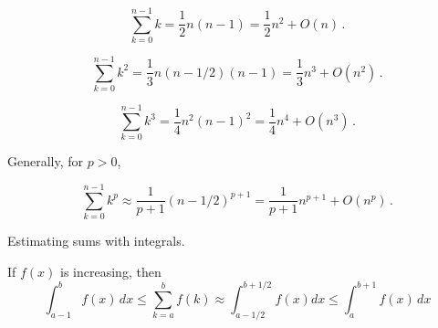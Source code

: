 \documentclass{tufte-handout}
\theoremstyle{definition}
\theoremstyle{example}
\theoremstyle{theorem}
\begin{document}
\begin{equation}
  \sum_{k=0}^{n-1} k = \frac{1}{2} n(n-1) = \frac{1}{2} n^2 + O(n)\,.
\end{equation}

\begin{equation}
  \sum_{k=0}^{n-1} k^2 = \frac{1}{3}n(n-1/2)(n-1) = \frac{1}{3} n^3 + O(n^2) \,.
\end{equation}

\begin{equation}
  \sum_{k=0}^{n-1} k^3 = \frac{1}{4}n^2(n-1)^2 = \frac{1}{4} n^4 + O(n^3) \,.
\end{equation}

Generally, for $p>0$,

\begin{equation}
  \sum_{k=0}^{n-1} k^p \approx \frac{1}{p+1} (n-1/2)^{p+1} = \frac{1}{p+1} n^{p+1} +O(n^p) \,.
\end{equation}

Estimating sums with integrals.

If $f(x)$ is increasing, then
\begin{equation}
\int_{a-1}^{b} f(x) \, dx \leq \sum_{k=a}^{b} f(k) \approx \int_{a-1/2}^{b+1/2} f(x) dx \leq \int_{a}^{b+1} f(x) \, dx
\end{equation}
\end{document}
